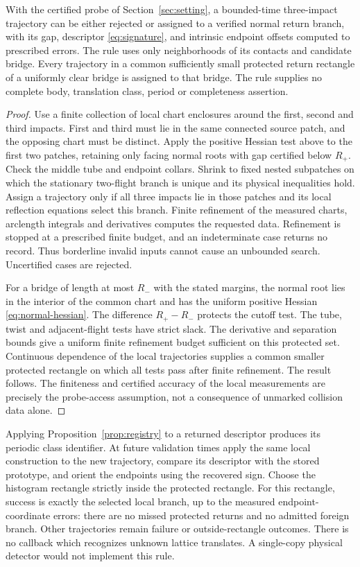 \begin{lemma}
\label{lem:probe}
With the certified probe of Section~\ref{sec:setting}, a bounded-time
three-impact trajectory can be either rejected or assigned to a verified
normal return branch, with its gap, descriptor \eqref{eq:signature},
and intrinsic endpoint offsets computed to prescribed errors. The rule
uses only neighborhoods of its contacts and candidate bridge. Every
trajectory in a common sufficiently small protected return rectangle of
a uniformly clear bridge is assigned to that bridge. The rule supplies
no complete body, translation class, period or completeness assertion.
\end{lemma}
\begin{proof}
Use a finite collection of local chart enclosures around the first,
second and third impacts. First and third must lie in the same connected
source patch, and the opposing chart must be distinct. Apply the positive
Hessian test above to the first two patches, retaining only facing
normal roots with gap certified below $R_+$. Check the middle tube and
endpoint collars. Shrink to fixed nested subpatches on which the
stationary two-flight branch is unique and its physical inequalities
hold. Assign a trajectory only if all three impacts lie in those patches
and its local reflection equations select this branch. Finite refinement
of the measured charts, arclength integrals and derivatives computes the
requested data. Refinement is stopped at a prescribed finite budget, and an indeterminate
case returns no record. Thus borderline invalid inputs cannot cause an
unbounded search. Uncertified cases are rejected.

For a bridge of length at most $R_-$ with the stated margins, the
normal root lies in the interior of the common chart and has the uniform
positive Hessian \eqref{eq:normal-hessian}. The difference $R_+-R_-$
protects the cutoff test. The tube, twist and adjacent-flight tests have
strict slack. The derivative and separation bounds give a uniform finite
refinement budget sufficient on this protected set. Continuous dependence of the local trajectories supplies
a common smaller protected rectangle on which all tests pass after
finite refinement. The result follows. The finiteness and certified
accuracy of the local measurements are precisely the probe-access
assumption, not a consequence of unmarked collision data alone.
\end{proof}

Applying Proposition~\ref{prop:registry} to a returned descriptor produces
its periodic class identifier. At future validation times apply the same
local construction to the new trajectory, compare its descriptor with
the stored prototype, and orient the endpoints using the recovered sign.
Choose the histogram rectangle strictly inside the protected rectangle.
For this rectangle, success is exactly the selected local branch, up to
the measured endpoint-coordinate errors: there are no missed protected
returns and no admitted foreign branch. Other trajectories remain failure
or outside-rectangle outcomes. There is no callback which recognizes
unknown lattice translates. A single-copy physical detector would not
implement this rule.

